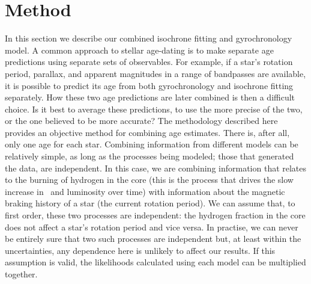 \section{Method}
\label{section:method}

In this section we describe our combined isochrone fitting and gyrochronology
model.
A common approach to stellar age-dating is to make separate age predictions
using separate sets of observables.
For example, if a star's rotation period, parallax, and apparent magnitudes in
a range of bandpasses are available, it is possible to predict its age from
both gyrochronology and isochrone fitting separately.
How these two age predictions are later combined is then a difficult choice.
Is it best to average these predictions, to use the more precise of the two,
or the one believed to be more accurate?
The methodology described here provides an objective method for combining age
estimates.
There is, after all, only one age for each star.
Combining information from different models can be relatively simple, as long
as the processes being modeled; those that generated the data, are
independent.
In this case, we are combining information that relates to the burning of
hydrogen in the core (this is the process that drives the slow increase in
\teff\ and luminosity over time) with information about the magnetic braking
history of a star (the current rotation period).
We can assume that, to first order, these two processes are independent: the
hydrogen fraction in the core does not affect a star's rotation period and
vice versa.
In practise,  we can never be entirely sure that two such processes are
independent but, at least within the uncertainties, any dependence here is
unlikely to affect our results.
If this assumption is valid, the likelihoods calculated using each model can
be multiplied together.

